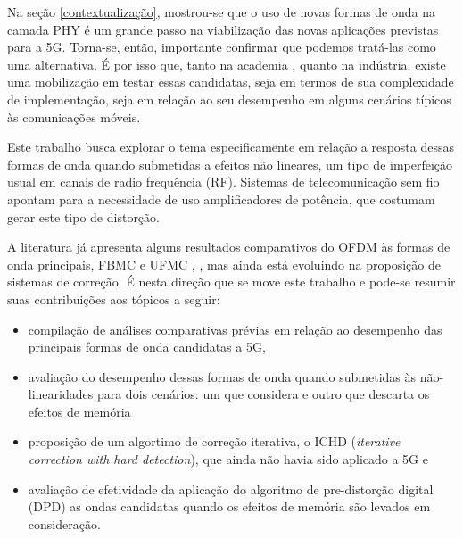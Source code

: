 Na seção \ref{contextualização}, mostrou-se que o uso de novas formas de onda na camada PHY é um grande passo na viabilização das novas aplicações previstas para a 5G. Torna-se, então, importante confirmar que podemos tratá-las como uma alternativa. É por isso que, tanto na academia \cite{Liu}, \cite{Gerzaguet} quanto na indústria, existe uma mobilização em testar essas candidatas, seja em termos de sua complexidade de implementação, seja em relação ao seu desempenho em alguns cenários típicos às comunicações móveis.  
\par Este trabalho busca explorar o tema especificamente em relação a resposta dessas formas de onda quando submetidas a efeitos não lineares, um tipo de imperfeição usual em canais de radio frequência (RF). Sistemas de telecomunicação sem fio apontam para a necessidade de uso amplificadores de potência, que costumam gerar este tipo de distorção.  
\par A literatura já apresenta alguns resultados comparativos do OFDM às formas de onda principais, FBMC e UFMC \cite{Changyoung},\cite{Maheswari} , mas ainda está evoluindo na proposição de sistemas de correção. É nesta direção que se move este trabalho e pode-se resumir suas contribuições aos tópicos a seguir:
\begin{itemize}

\item compilação de análises comparativas prévias em relação ao desempenho das principais formas de onda candidatas a 5G,
\item avaliação do desempenho dessas formas de onda quando submetidas às não-linearidades para dois cenários: um que considera e outro que descarta os efeitos de memória
\item proposição de um algortimo de correção iterativa, o ICHD (\textit{iterative correction with hard detection}), que ainda não havia sido aplicado a 5G e
\item avaliação de efetividade da aplicação do algoritmo de pre-distorção digital (DPD) as ondas candidatas quando os efeitos de memória são levados em consideração. 
 
 \end{itemize}

